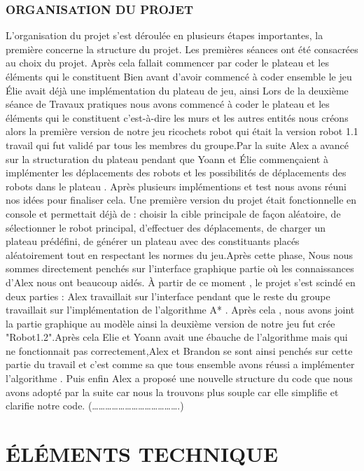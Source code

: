 \documentclass[a4paper]{article} %
\begin{document}
		\subsubsection{ ORGANISATION DU PROJET 
}
L'organisation du projet s'est déroulée en plusieurs étapes importantes, la première concerne la structure du projet. Les premières séances ont été consacrées au choix du projet. Après cela fallait commencer par coder le plateau et les éléments qui le constituent Bien avant d’avoir commencé à coder ensemble le jeu  Élie avait déjà une implémentation du plateau de jeu, ainsi Lors de la deuxième séance de Travaux pratiques  nous avons commencé à coder le plateau et les éléments qui le constituent c'est-à-dire les murs et les autres entités nous créons alors la première version de notre  jeu ricochets robot qui était la version robot 1.1 travail qui fut validé par tous les membres du groupe.Par la suite Alex a avancé sur la structuration du plateau  pendant que Yoann et Élie  commençaient à implémenter les déplacements des robots et les possibilités de déplacements des robots dans le plateau . Après plusieurs implémentions et test nous avons réuni nos idées pour finaliser cela. Une première version du projet était fonctionnelle en console et permettait déjà de :  choisir la cible principale de façon aléatoire, de sélectionner le robot principal, d’effectuer des déplacements, de charger un plateau prédéfini, de générer un plateau avec des constituants placés aléatoirement tout en respectant les normes du jeu.Après cette phase, Nous nous sommes directement penchés sur l’interface graphique partie où les connaissances d’Alex nous ont beaucoup aidés. À partir de ce moment , le projet s’est scindé en deux parties : Alex travaillait sur l’interface pendant que le reste du groupe travaillait sur l’implémentation de l’algorithme A* .
Après cela , nous avons joint la partie graphique au modèle ainsi la deuxième version de notre jeu fut crée "Robot1.2".Après cela Elie et Yoann avait une ébauche de l'algorithme mais qui ne fonctionnait pas correctement,Alex et Brandon se sont ainsi penchés sur cette partie du travail et c'est comme sa que tous ensemble avons réussi a implémenter l'algorithme .
Puis enfin Alex a proposé une nouvelle structure du code que nous avons adopté par la suite car nous la trouvons plus souple car elle simplifie et clarifie notre code. 
(………………………………….)

\section{ÉLÉMENTS  TECHNIQUE }	
\end{document}
